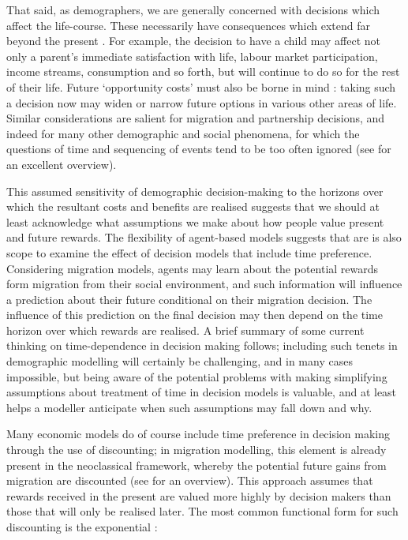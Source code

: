 \documentclass{article}
\begin{document}
That said, as demographers, we are generally concerned with decisions which affect the life-course. These necessarily have consequences which extend far beyond the present \citep{Willekens2001}. For example, the decision to have a child may affect not only a parent's immediate satisfaction with life, labour market participation, income streams, consumption and so forth, but will continue to do so for the rest of their life. Future `opportunity costs' must also be borne in mind \citep{Butz1979}: taking such a decision now may widen or narrow future options in various other areas of life. Similar considerations are salient for migration and partnership decisions, and indeed for many other demographic and social phenomena, for which the questions of time and sequencing of events tend to be too often ignored (see \citet{Abbott2001} for an excellent overview).


This assumed sensitivity of demographic decision-making to the horizons over which the resultant costs and benefits are realised suggests that we should at least acknowledge what assumptions we make about how people value present and future rewards. The flexibility of agent-based models suggests that are is also scope to examine the effect of decision models that include time preference. Considering migration models, agents may learn about the potential rewards form migration from their social environment, and such information will influence a prediction about their future conditional on their migration decision. The influence of this prediction on the final decision may then depend on the time horizon over which rewards are realised.  A brief summary of some current thinking on time-dependence in decision making follows; including such tenets in demographic modelling will certainly be challenging, and in many cases impossible, but being aware of the potential problems with making simplifying assumptions about treatment of time in decision models is valuable, and at least helps a modeller anticipate when such assumptions may fall down and why.

Many economic models do of course include time preference in decision making through the use of discounting; in migration modelling, this element is already present in the neoclassical framework, whereby the potential future gains from migration are discounted (see \citet{Massey1993} for an overview). This approach assumes that rewards received in the present are valued more highly by decision makers than those that will only be realised later. The most common functional form for such discounting is the exponential \citep{ODonoghue2000}:
\end{document}
